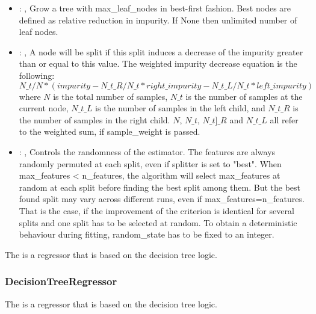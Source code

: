 \begin{itemize}
    \item {}: , 
      Grow a tree with max\_leaf\_nodes in best-first fashion. Best nodes are defined as relative
      reduction                                                  in impurity. If None then unlimited
      number of leaf nodes.

    \item {}: , 
      A node will be split if this split induces a decrease of the impurity greater than or equal to
      this value.                                                  The weighted impurity decrease
      equation is the following:                                                  $N\_t / N *
      (impurity - N\_t\_R / N\_t * right\_impurity - N\_t\_L / N\_t * left\_impurity)$
      where $N$ is the total number of samples, $N\_t$ is the number of samples at the current node,
      $N\_t\_L$ is the number                                                  of samples in the
      left child, and $N\_t\_R$ is the number of samples in the right child.
      $N$, $N\_t$, $N\_t]\_R$ and $N\_t\_L$ all refer to the weighted sum, if sample\_weight is
      passed.

    \item {}: , 
      Controls the randomness of the estimator. The features are
      always randomly permuted at each split, even if splitter is set to
      "best". When max\_features < n\_features, the algorithm will select
      max\_features at random at each split before finding the best split
      among them. But the best found split may vary across different runs,
      even if max\_features=n\_features. That is the case, if the improvement
      of the criterion is identical for several splits and one split has to
      be selected at random. To obtain a deterministic behaviour during
      fitting, random\_state has to be fixed to an integer.
  \end{itemize}
 The  is a regressor that is based on the
 decision tree logic.                          

\subsubsection{DecisionTreeRegressor}
  The  is a regressor that is based on the
  decision tree logic.                          

